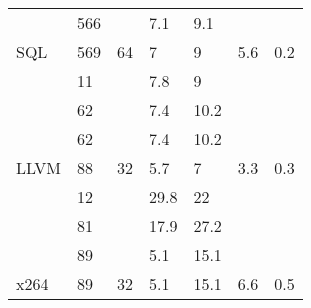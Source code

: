 \begin{table*}[]
\begin{tabular}{|l|l|l|ll|l|l|}
                                   & 566                                          &                                            & \multicolumn{1}{l|}{\cellcolor[HTML]{C0C0C0}7.1}  & \cellcolor[HTML]{C0C0C0}9.1  &                       &                       \\ \cline{2-2} \cline{4-5}
\multirow{-4}{*}{SQL}              & 569                                          & \multirow{-4}{*}{64}                       & \multicolumn{1}{l|}{\cellcolor[HTML]{C0C0C0}7}    & \cellcolor[HTML]{C0C0C0}9    & \multirow{-4}{*}{5.6} & \multirow{-4}{*}{0.2} \\ \hline
                                   & 11                                           &                                            & \multicolumn{1}{l|}{\cellcolor[HTML]{C0C0C0}7.8}  & \cellcolor[HTML]{C0C0C0}9    &                       &                       \\ \cline{2-2} \cline{4-5}
                                   & 62                                           &                                            & \multicolumn{1}{l|}{\cellcolor[HTML]{C0C0C0}7.4}  & \cellcolor[HTML]{C0C0C0}10.2 &                       &                       \\ \cline{2-2} \cline{4-5}
                                   & 62                                           &                                            & \multicolumn{1}{l|}{\cellcolor[HTML]{C0C0C0}7.4}  & \cellcolor[HTML]{C0C0C0}10.2 &                       &                       \\ \cline{2-2} \cline{4-5}
\multirow{-4}{*}{LLVM}             & 88                                           & \multirow{-4}{*}{32}                       & \multicolumn{1}{l|}{\cellcolor[HTML]{C0C0C0}5.7}  & \cellcolor[HTML]{C0C0C0}7    & \multirow{-4}{*}{3.3} & \multirow{-4}{*}{0.3} \\ \hline
                                   & 12                                           &                                            & \multicolumn{1}{l|}{\cellcolor[HTML]{C0C0C0}29.8} & \cellcolor[HTML]{C0C0C0}22   &                       &                       \\ \cline{2-2} \cline{4-5}
                                   & 81                                           &                                            & \multicolumn{1}{l|}{\cellcolor[HTML]{C0C0C0}17.9} & \cellcolor[HTML]{C0C0C0}27.2 &                       &                       \\ \cline{2-2} \cline{4-5}
                                   & 89                                           &                                            & \multicolumn{1}{l|}{5.1}                          & 15.1                         &                       &                       \\ \cline{2-2} \cline{4-5}
\multirow{-4}{*}{x264}             & 89                                           & \multirow{-4}{*}{32}                       & 5.1                                               & 15.1                         & \multirow{-4}{*}{6.6} & \multirow{-4}{*}{0.5} \\ \hline
\end{tabular}
\end{table*}